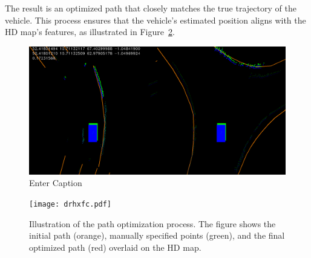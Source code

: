 The result is an optimized path that closely matches the true trajectory of the vehicle. This process ensures that the vehicle’s estimated position aligns with the HD map's features, as illustrated in Figure~\ref{fig:optimizer}.
\begin{figure}[H]
    \centering
    \includegraphics[width=0.75\linewidth]{LateX//figs/opt_pose.png}
    \caption{Enter Caption}
    \label{fig:enter-label}
\end{figure}

\begin{figure}[H]
    \centering
    \texttt{[image: drhxfc.pdf]}
    \caption{Illustration of the path optimization process. The figure shows the initial path (orange), manually specified points (green), and the final optimized path (red) overlaid on the HD map.}
    \label{fig:optimizer}
\end{figure}


